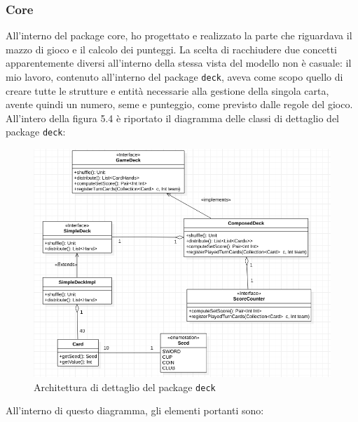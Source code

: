 \subsubsection{\textbf{Core}}
All'interno del package core, ho progettato e realizzato la parte che riguardava il mazzo di gioco e il calcolo dei punteggi.
La scelta di racchiudere due concetti apparentemente diversi all'interno della stessa vista del modello non è casuale: il mio lavoro, contenuto all'interno del package \texttt{deck}, aveva come scopo quello di creare tutte le strutture e entità necessarie alla gestione della singola carta, avente quindi un numero, seme e punteggio, come previsto dalle regole del gioco.
All'intero della figura 5.4 è riportato il diagramma delle classi di dettaglio del package \texttt{deck}:
 \begin{figure}[H]
	\includegraphics[width=\textwidth,height=\textheight,keepaspectratio]{deckArchitecture}
	\caption{Architettura di dettaglio del package \texttt{deck}}
\end{figure}
All'interno di questo diagramma, gli elementi portanti sono:
